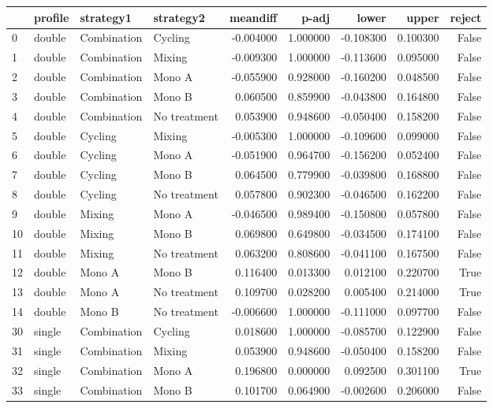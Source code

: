 \begin{tabular}{llllrrrrr}
\toprule
 & profile & strategy1 & strategy2 & meandiff & p-adj & lower & upper & reject \\
\midrule
0 & double & Combination & Cycling & -0.004000 & 1.000000 & -0.108300 & 0.100300 & False \\
1 & double & Combination & Mixing & -0.009300 & 1.000000 & -0.113600 & 0.095000 & False \\
2 & double & Combination & Mono A & -0.055900 & 0.928000 & -0.160200 & 0.048500 & False \\
3 & double & Combination & Mono B & 0.060500 & 0.859900 & -0.043800 & 0.164800 & False \\
4 & double & Combination & No treatment & 0.053900 & 0.948600 & -0.050400 & 0.158200 & False \\
5 & double & Cycling & Mixing & -0.005300 & 1.000000 & -0.109600 & 0.099000 & False \\
6 & double & Cycling & Mono A & -0.051900 & 0.964700 & -0.156200 & 0.052400 & False \\
7 & double & Cycling & Mono B & 0.064500 & 0.779900 & -0.039800 & 0.168800 & False \\
8 & double & Cycling & No treatment & 0.057800 & 0.902300 & -0.046500 & 0.162200 & False \\
9 & double & Mixing & Mono A & -0.046500 & 0.989400 & -0.150800 & 0.057800 & False \\
10 & double & Mixing & Mono B & 0.069800 & 0.649800 & -0.034500 & 0.174100 & False \\
11 & double & Mixing & No treatment & 0.063200 & 0.808600 & -0.041100 & 0.167500 & False \\
12 & double & Mono A & Mono B & 0.116400 & 0.013300 & 0.012100 & 0.220700 & True \\
13 & double & Mono A & No treatment & 0.109700 & 0.028200 & 0.005400 & 0.214000 & True \\
14 & double & Mono B & No treatment & -0.006600 & 1.000000 & -0.111000 & 0.097700 & False \\
30 & single & Combination & Cycling & 0.018600 & 1.000000 & -0.085700 & 0.122900 & False \\
31 & single & Combination & Mixing & 0.053900 & 0.948600 & -0.050400 & 0.158200 & False \\
32 & single & Combination & Mono A & 0.196800 & 0.000000 & 0.092500 & 0.301100 & True \\
33 & single & Combination & Mono B & 0.101700 & 0.064900 & -0.002600 & 0.206000 & False \\

\end{tabular}
